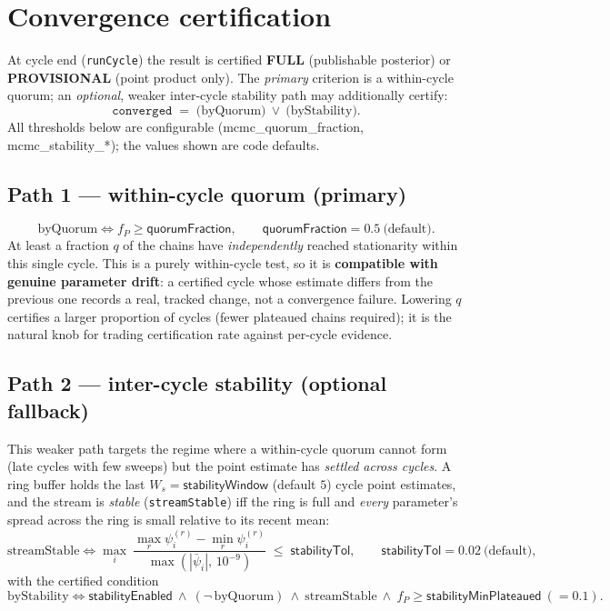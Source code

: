 \documentclass[11pt]{article}
\newcommand{\code}[1]{\texttt{\small #1}}
\newcommand{\param}[1]{\textsf{#1}}
\begin{document}
\section{Convergence certification}\label{sec:convergence}

At cycle end (\code{runCycle}) the result is certified \textbf{FULL}
(publishable posterior) or \textbf{PROVISIONAL} (point product only). The
\emph{primary} criterion is a within-cycle quorum; an \emph{optional},
weaker inter-cycle stability path may additionally certify:
\begin{equation}
  \texttt{converged} \;=\; \text{(byQuorum)} \ \lor\ \text{(byStability)}.
\end{equation}
All thresholds below are configurable (\param{mcmc\_quorum\_fraction},
\param{mcmc\_stability\_*}); the values shown are code defaults.

\subsection{Path 1 --- within-cycle quorum (primary)}
\begin{equation}
  \text{byQuorum} \iff f_P \ge \param{quorumFraction},
  \qquad \param{quorumFraction}=0.5\ \text{(default)}.
\end{equation}
At least a fraction $q$ of the chains have \emph{independently} reached
stationarity within this single cycle. This is a purely within-cycle test,
so it is \textbf{compatible with genuine parameter drift}: a certified
cycle whose estimate differs from the previous one records a real, tracked
change, not a convergence failure. Lowering $q$ certifies a larger
proportion of cycles (fewer plateaued chains required); it is the natural
knob for trading certification rate against per-cycle evidence.

\subsection{Path 2 --- inter-cycle stability (optional fallback)}
This weaker path targets the regime where a within-cycle quorum cannot
form (late cycles with few sweeps) but the point estimate has
\emph{settled across cycles}. A ring buffer holds the last
$W_s=\param{stabilityWindow}$ (default $5$) cycle point estimates, and the
stream is \emph{stable} (\code{streamStable}) iff the ring is full and
\emph{every} parameter's spread across the ring is small relative to its
recent mean:
\begin{equation}
  \text{streamStable} \iff
  \max_{i}\ \frac{\max_r \psi_i^{(r)} - \min_r \psi_i^{(r)}}
  {\max(|\bar\psi_i|,\,10^{-9})} \;\le\; \param{stabilityTol},
  \qquad \param{stabilityTol}=0.02\ \text{(default)},
\end{equation}
with the certified condition
\begin{equation}
  \text{byStability} \iff \param{stabilityEnabled}\ \wedge\
  (\neg\,\text{byQuorum}) \ \wedge\ \text{streamStable} \ \wedge\
  f_P \ge \param{stabilityMinPlateaued}\ (=0.1).
\end{equation}
\end{document}
